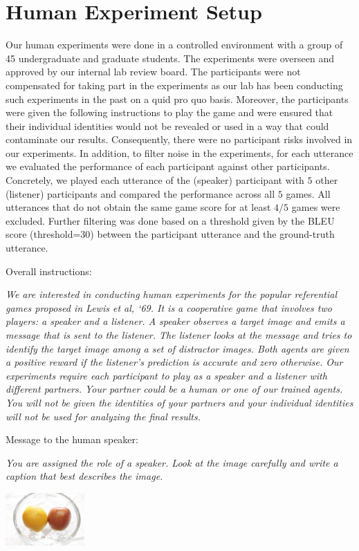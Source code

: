 \documentclass{article}
\begin{document}
\section{Human Experiment Setup}
Our human experiments were done in a controlled environment with a group of 45 undergraduate and graduate students. The experiments were overseen and approved by our internal lab review board. The participants were not compensated for taking part in the experiments as our lab has been conducting such experiments in the past on a quid pro quo basis. Moreover, the participants were given the following instructions to play the game and were ensured that their individual identities would not be revealed or used in a way that could contaminate our results. Consequently, there were no participant risks involved in our experiments. In addition, to filter noise in the experiments, for each utterance we evaluated the performance of each participant against other participants. Concretely, we played each utterance of the (speaker) participant with $5$ other (listener) participants and compared the performance across all $5$ games. All utterances that do not obtain the same game score for at least $4/5$ games were excluded. Further filtering was done based on a threshold given by the BLEU score (threshold=$30$) between the participant utterance and the ground-truth utterance.

Overall instructions:

\emph{We are interested in conducting human experiments for the popular referential games proposed in Lewis et al, ‘69. It is a cooperative game that involves two players: a speaker and a listener. A speaker observes a target image and emits a message that is sent to the listener. The listener looks at the message and tries to identify the target image among a set of distractor images. Both agents are given a positive reward if the listener’s prediction is accurate and zero otherwise. Our experiments require each participant to play as a speaker and a listener with different partners. Your partner could be a human or one of our trained agents. You will not be given the identities of your partners and your individual identities will not be used for analyzing the final results.}

\begin{minipage}{0.7\textwidth}
Message to the human speaker:

\emph{You are assigned the role of a speaker.
Look at the image carefully and write a caption that best describes the image.}
\end{minipage}
\qquad
\begin{minipage}{0.2\textwidth}
    \centering
    \includegraphics[width=0.98\linewidth, height=2cm]{figs/sample-target.jpeg}
\end{minipage}
\end{document}
